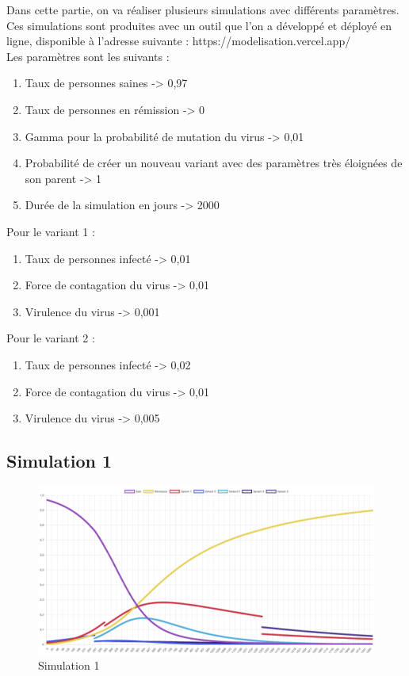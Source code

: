\documentclass{article}
\begin{document}
Dans cette partie, on va réaliser plusieurs simulations avec différents paramètres. Ces simulations sont produites avec un outil que l'on a développé et déployé en ligne, disponible à l'adresse suivante : https://modelisation.vercel.app/ \\
Les paramètres sont les suivants : \\
\begin{enumerate}
    \item Taux de personnes saines -> 0,97
    \item Taux de personnes en rémission -> 0
    \item Gamma pour la probabilité de mutation du virus -> 0,01
    \item Probabilité de créer un nouveau variant avec des paramètres très éloignées de son parent -> 1
    \item Durée de la simulation en jours -> 2000\\
\end{enumerate}
Pour le variant 1 : 
\begin{enumerate}
    \item Taux de personnes infecté -> 0,01
    \item Force de contagation du virus -> 0,01
    \item Virulence du virus -> 0,001\\
\end{enumerate}
Pour le variant 2 : 
\begin{enumerate}
    \item Taux de personnes infecté -> 0,02
    \item Force de contagation du virus -> 0,01
    \item Virulence du virus -> 0,005\\
\end{enumerate}

\subsection{Simulation 1}

\begin{figure}[h]
    \includegraphics[width=\linewidth]{images/Simulation1.png}
    \caption{Simulation 1}
    \label{fig:simulation1}
\end{figure}
\end{document}
